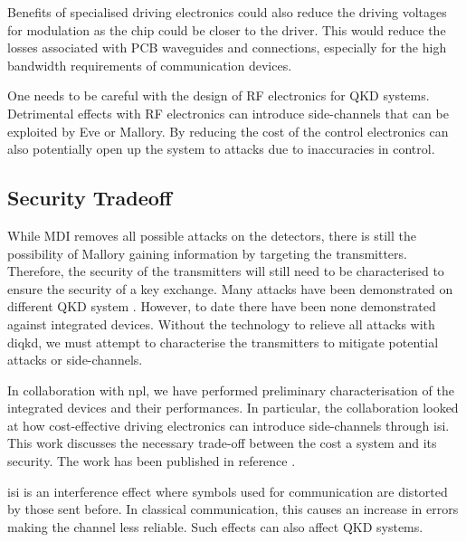 Benefits of specialised driving electronics could also reduce the driving voltages for modulation as the chip could be closer to the driver. This would reduce the losses associated with PCB waveguides and connections, especially for the high bandwidth requirements of communication devices. 



One needs to be careful with the design of RF electronics for \ac{QKD} systems. Detrimental effects with RF electronics can introduce side-channels that can be exploited by Eve or Mallory. By reducing the cost of the control electronics can also potentially open up the system to attacks due to inaccuracies in control. 

\subsection{Security Tradeoff}

While \ac{MDI} removes all possible attacks on the detectors, there is still the possibility of Mallory gaining information by targeting the transmitters. Therefore, the security of the transmitters will still need to be characterised to ensure the security of a key exchange. Many attacks have been demonstrated on different \ac{QKD} system \cite{makarov2019}. However, to date there have been none demonstrated against integrated devices. Without the technology to relieve all attacks with \ac{diqkd}, we must attempt to characterise the transmitters to mitigate potential attacks or side-channels.

In collaboration with \ac{npl}, we have performed preliminary characterisation of the integrated devices and their performances. In particular, the collaboration looked at how cost-effective driving electronics can introduce side-channels through \ac{isi}. This work discusses the necessary trade-off between the cost a system and its security. The work has been published in reference \cite{vaquero2018}.

\Ac{isi} is an interference effect where symbols used for communication are distorted by those sent before. In classical communication, this causes an increase in errors making the channel less reliable. Such effects can also affect \ac{QKD} systems.

